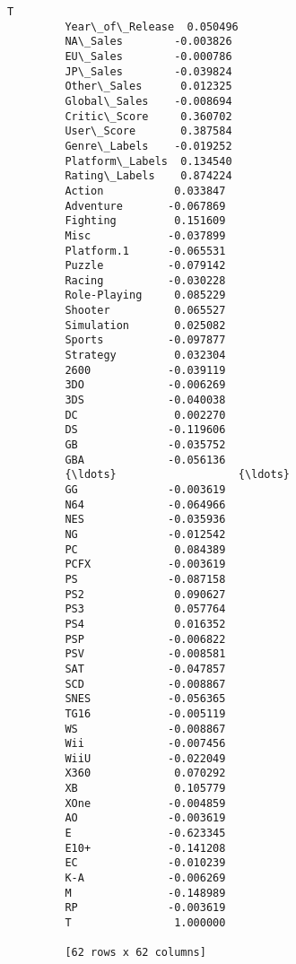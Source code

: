\documentclass[11pt]{article}
\begin{document}
\begin{Verbatim}[commandchars=\\\{\}]
                                 T  
         Year\_of\_Release  0.050496  
         NA\_Sales        -0.003826  
         EU\_Sales        -0.000786  
         JP\_Sales        -0.039824  
         Other\_Sales      0.012325  
         Global\_Sales    -0.008694  
         Critic\_Score     0.360702  
         User\_Score       0.387584  
         Genre\_Labels    -0.019252  
         Platform\_Labels  0.134540  
         Rating\_Labels    0.874224  
         Action           0.033847  
         Adventure       -0.067869  
         Fighting         0.151609  
         Misc            -0.037899  
         Platform.1      -0.065531  
         Puzzle          -0.079142  
         Racing          -0.030228  
         Role-Playing     0.085229  
         Shooter          0.065527  
         Simulation       0.025082  
         Sports          -0.097877  
         Strategy         0.032304  
         2600            -0.039119  
         3DO             -0.006269  
         3DS             -0.040038  
         DC               0.002270  
         DS              -0.119606  
         GB              -0.035752  
         GBA             -0.056136  
         {\ldots}                   {\ldots}  
         GG              -0.003619  
         N64             -0.064966  
         NES             -0.035936  
         NG              -0.012542  
         PC               0.084389  
         PCFX            -0.003619  
         PS              -0.087158  
         PS2              0.090627  
         PS3              0.057764  
         PS4              0.016352  
         PSP             -0.006822  
         PSV             -0.008581  
         SAT             -0.047857  
         SCD             -0.008867  
         SNES            -0.056365  
         TG16            -0.005119  
         WS              -0.008867  
         Wii             -0.007456  
         WiiU            -0.022049  
         X360             0.070292  
         XB               0.105779  
         XOne            -0.004859  
         AO              -0.003619  
         E               -0.623345  
         E10+            -0.141208  
         EC              -0.010239  
         K-A             -0.006269  
         M               -0.148989  
         RP              -0.003619  
         T                1.000000  
         
         [62 rows x 62 columns]
\end{Verbatim}
            
\end{document}
